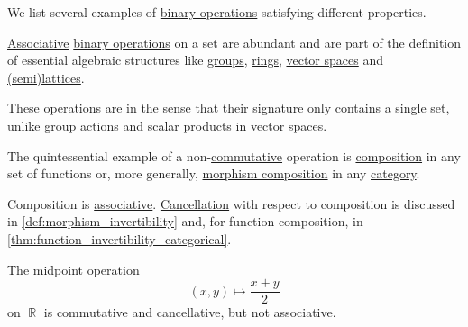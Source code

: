\begin{example}\label{ex:def:binary_operation}
  We list several examples of \hyperref[def:binary_operation]{binary operations} satisfying different properties.

  \begin{thmenum}
     \hyperref[eq:def:binary_operation/associative]{Associative} \hyperref[def:binary_operation]{binary operations} on a set are abundant and are part of the definition of essential algebraic structures like \hyperref[def:group]{groups}, \hyperref[def:ring]{rings}, \hyperref[def:vector_space]{vector spaces} and \hyperref[def:lattice]{(semi)lattices}.

    These operations are  in the sense that their signature only contains a single set, unlike \hyperref[def:group_action]{group actions} and scalar products in \hyperref[def:vector_space]{vector spaces}.

     The quintessential example of a non-\hyperref[def:binary_operation/commutative]{commutative} operation is \hyperref[def:set_valued_map/composition]{composition} in any set of functions or, more generally, \hyperref[def:category/composition]{morphism composition} in any \hyperref[def:category]{category}.

    Composition is \hyperref[def:binary_operation/associative]{associative}. \hyperref[def:binary_operation/cancellative]{Cancellation} with respect to composition is discussed in \cref{def:morphism_invertibility} and, for function composition, in \cref{thm:function_invertibility_categorical}.

     The midpoint operation
    \begin{equation*}
      (x, y) \mapsto \dfrac {x + y} 2
    \end{equation*}
    on \( \BbbR \) is commutative and cancellative, but not associative.
  \end{thmenum}
\end{example}

